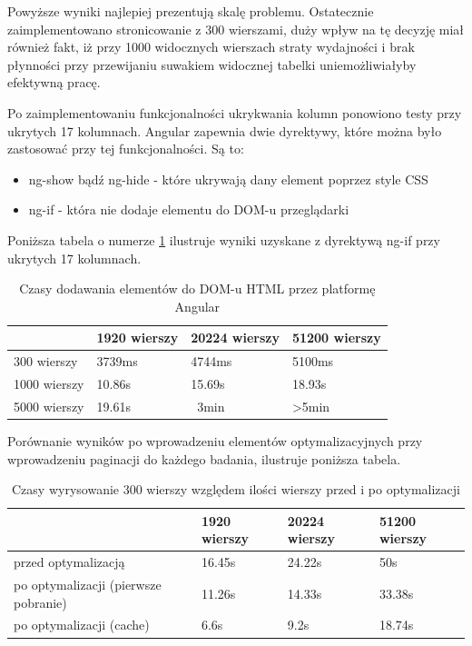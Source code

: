 \documentclass[a4paper,12pt,twoside]{article}
\begin{document}
Powyższe wyniki najlepiej prezentują skalę problemu. Ostatecznie zaimplementowano
stronicowanie z 300 wierszami, duży wpływ na tę decyzję miał również fakt, iż
przy 1000 widocznych wierszach straty wydajności i brak płynności przy przewijaniu
suwakiem widocznej tabelki uniemożliwiałyby efektywną pracę.

Po zaimplementowaniu funkcjonalności ukrykwania kolumn ponowiono testy przy ukrytych 17 kolumnach. Angular zapewnia dwie dyrektywy, które można było zastosować przy tej funkcjonalności. Są to:
\begin{itemize}
\item ng-show bądź ng-hide - które ukrywają dany element poprzez style CSS
\item ng-if - która nie dodaje elementu do DOM-u przeglądarki
\end{itemize}

Poniższa tabela o numerze \ref{table:tableRenderNgIf} ilustruje wyniki uzyskane z dyrektywą ng-if przy ukrytych 17 kolumnach.
\begin{table} [H]
\begin{tabular}{| p{3cm} | p{3cm} | p{3cm} | p{3cm}|}
\hline
& 1920 wierszy & 20224 wierszy & 51200 wierszy\\
\hline
300 wierszy& 3739ms& 4744ms& 5100ms\\ \hline
1000 wierszy& 10.86s & 15.69s& 18.93s\\ \hline
5000 wierszy& 19.61s& ~3min& >5min\\ \hline
\end{tabular}
\caption{Czasy dodawania elementów do DOM-u HTML przez platformę Angular}
\label{table:tableRenderNgIf}
\end{table}

Porównanie wyników po wprowadzeniu elementów optymalizacyjnych przy
wprowadzeniu paginacji do każdego badania, ilustruje poniższa
tabela.

\begin{table} [H]
\begin{tabular}{| p{3cm} | p{3cm} | p{3cm} | p{3cm}|}
\hline
& 1920 wierszy & 20224 wierszy & 51200 wierszy\\
\hline
przed optymalizacją& 16.45s& 24.22s& 50s\\ \hline
po optymalizacji (pierwsze pobranie)& 11.26s & 14.33s& 33.38s\\ \hline
po optymalizacji (cache)& 6.6s& 9.2s& 18.74s\\ \hline
\end{tabular}
\caption{Czasy wyrysowanie 300 wierszy względem ilości wierszy przed i po optymalizacji}
\label{table:summaryRender}
\end{table}
\end{document}
